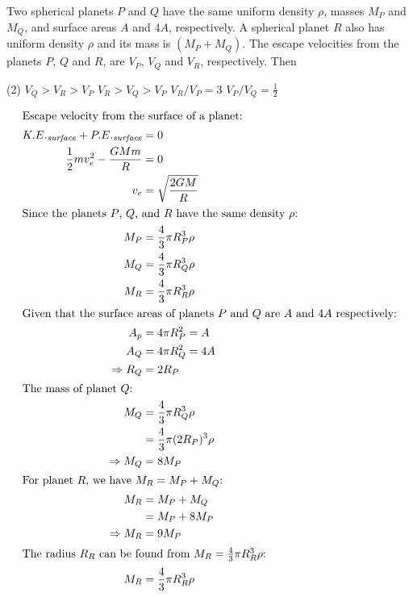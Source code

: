 
\item Two spherical planets \( P \) and \( Q \) have the same uniform density \( \rho \), masses \( M_P \) and \( M_Q \), and surface areas \( A \) and \( 4A \), respectively. A spherical planet \( R \) also has uniform density \( \rho \) and its mass is \( (M_P + M_Q) \). The escape velocities from the planets \( P \), \( Q \) and \( R \), are \( V_P \), \( V_Q \) and \( V_R \), respectively. Then
    \begin{tasks}(2)
        \task \( V_Q > V_R > V_P \)
        \task \( V_R > V_Q > V_P \)\ans
        \task \( V_R / V_P = 3 \)
        \task \( V_P / V_Q = \frac{1}{2} \)\ans
    \end{tasks}
    \begin{solution}
        \begin{align*}
            \intertext{Escape velocity from the surface of a planet:}
            K.E._{\textit{surface}} + P.E._{\textit{surface}} &= 0 \\
            \frac{1}{2}mv^2_e - \frac{GMm}{R} &= 0 \\
            v_e &= \sqrt{\frac{2GM}{R}} \\
            \intertext{Since the planets $P$, $Q$, and $R$ have the same density $\rho$:}
            M_P &= \frac{4}{3} \pi R_P^3 \rho\\
            M_Q &= \frac{4}{3} \pi R_Q^3 \rho\\
            M_R &= \frac{4}{3} \pi R_R^3 \rho\\
            \intertext{Given that the surface areas of planets $P$ and $Q$ are $A$ and $4A$ respectively:}
            A_p &= 4 \pi R_P^2 = A\\
            A_Q &= 4 \pi R_Q^2 = 4A\\
            \Rightarrow R_Q &= 2R_P\\
            \intertext{The mass of planet $Q$:}
            M_Q &= \frac{4}{3} \pi R_Q^3 \rho \\
            &= \frac{4}{3} \pi (2R_P)^3 \rho \\
            \Rightarrow M_Q &= 8M_P\\
            \intertext{For planet $R$, we have $M_R = M_P + M_Q$:}
            M_R &= M_P + M_Q\\
            &= M_P + 8M_P\\
            \Rightarrow M_R &= 9M_P\\
            \intertext{The radius $R_R$ can be found from $M_R = \frac{4}{3} \pi R_R^3 \rho$:}
            M_R &= \frac{4}{3} \pi R_R^3 \rho\\

\end{align*}
\end{solution}
